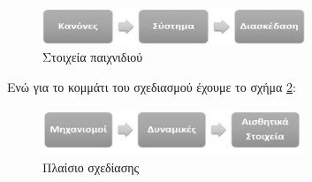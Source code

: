 		\begin{figure}[h]
		    \centering
		    \includegraphics[width=0.7\textwidth]{mda_1.jpg}
		    \caption{Στοιχεία παιχνιδιού}
		    \label{fig:mda_1}
		\end{figure}	
	
		Ενώ για το κομμάτι του σχεδιασμού έχουμε το σχήμα \ref{fig:mda_2}:	
	
		\begin{figure}[h]
		    \centering
		    \includegraphics[width=0.7\textwidth]{mda_2.jpg}
		    \caption{Πλαίσιο σχεδίασης}
		    \label{fig:mda_2}
		\end{figure}
	
